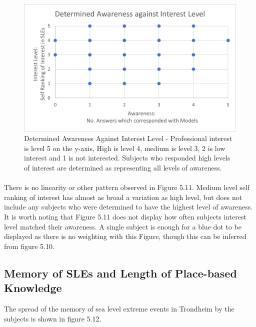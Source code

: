 \begin{figure}[H]
    \centering
    \includegraphics{fig_results/aware_vs_interest.png}
    \caption{Determined Awareness Against Interest Level -  Professional interest is level 5 on the y-axis, High  is level 4, medium is level 3, 2 is low interest and 1 is not interested. Subjects who responded high levels of interest are determined as representing all levels of awareness.}
    \label{fig:aware_vs_interest}
\end{figure}
\paragraph{}

There is no linearity or other pattern observed in Figure 5.11. Medium level self ranking of interest has almost as broad a variation as high level, but does not include any subjects who were determined to have the highest level of awareness.  It is worth noting  that Figure 5.11 does not display how often subjects interest level matched their awareness. A single subject is enough for a blue dot to be displayed as there is no weighting with this Figure, though this can be inferred from figure 5.10. 


\subsection{Memory of SLEs and Length of Place-based Knowledge}
The spread of the memory of sea level extreme events in Trondheim by the subjects is shown in figure 5.12.

